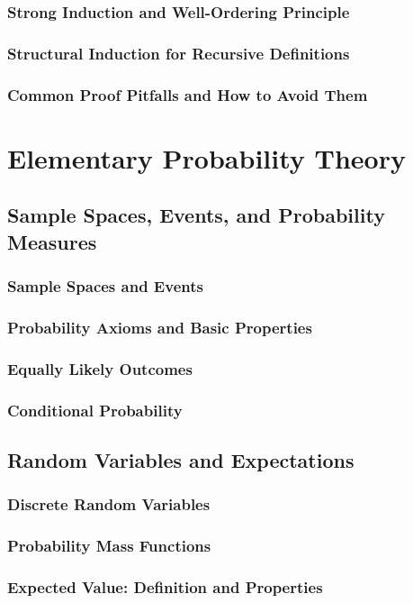 \subsubsection{Strong Induction and Well-Ordering Principle}
\subsubsection{Structural Induction for Recursive Definitions}
\subsubsection{Common Proof Pitfalls and How to Avoid Them}

\section{Elementary Probability Theory}
\subsection{Sample Spaces, Events, and Probability Measures}
\subsubsection{Sample Spaces and Events}
\subsubsection{Probability Axioms and Basic Properties}
\subsubsection{Equally Likely Outcomes}
\subsubsection{Conditional Probability}

\subsection{Random Variables and Expectations}
\subsubsection{Discrete Random Variables}
\subsubsection{Probability Mass Functions}
\subsubsection{Expected Value: Definition and Properties}
